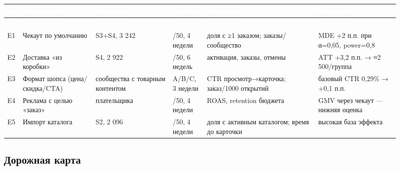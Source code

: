 \documentclass[10pt,a4paper]{article}
\begin{document}
\begingroup
\footnotesize
\setlength{\tabcolsep}{3pt}
\renewcommand{\arraystretch}{1.12}
\begin{longtable}{@{}>{\raggedright\arraybackslash}p{0.0239\linewidth}>{\raggedright\arraybackslash}p{0.1793\linewidth}>{\raggedright\arraybackslash}p{0.1853\linewidth}>{\raggedright\arraybackslash}p{0.0897\linewidth}>{\raggedright\arraybackslash}p{0.2630\linewidth}>{\raggedright\arraybackslash}p{0.1972\linewidth}@{}}
\rowcolor{blue}
\textcolor{white}{\textbf{\#}} & \textcolor{white}{\textbf{Эксперимент}} & \textcolor{white}{\textbf{Аудитория}} & \textcolor{white}{\textbf{Дизайн}} & \textcolor{white}{\textbf{Метрики}} & \textcolor{white}{\textbf{Мощность}} \\
\endfirsthead
\rowcolor{blue}
\textcolor{white}{\textbf{\#}} & \textcolor{white}{\textbf{Эксперимент}} & \textcolor{white}{\textbf{Аудитория}} & \textcolor{white}{\textbf{Дизайн}} & \textcolor{white}{\textbf{Метрики}} & \textcolor{white}{\textbf{Мощность}} \\
\endhead
\hline
E1 & Чекаут по умолчанию & S3+S4, 3 242 & 50/50, 4 недели & доля с ≥1 заказом; заказы/сообщество & MDE +2 п.п. при α=0,05, power=0,8 \\
E2 & Доставка «из коробки» & S4, 2 922 & 50/50, 6 недель & активация, заказы, отмены & ATT +3,2 п.п. → ≈2 500/группа \\
E3 & Формат шопса (цена/скидка/CTA) & сообщества с товарным контентом & A/B/C, 3 недели & CTR просмотр→карточка; заказ/1000 открытий & базовый CTR 0,29\% → +0,1 п.п. \\
E4 & Реклама с целью «заказ» & 542 плательщика & 50/50, 4 недели & ROAS, retention бюджета & GMV через чекаут — нижняя оценка \\
E5 & Импорт каталога & S2, 2 096 & 50/50, 4 недели & доля с активным каталогом; время до карточки & высокая база эффекта \\
\hline
\end{longtable}
\endgroup
\vspace{4pt}

\subsection{Дорожная карта}
\end{document}
